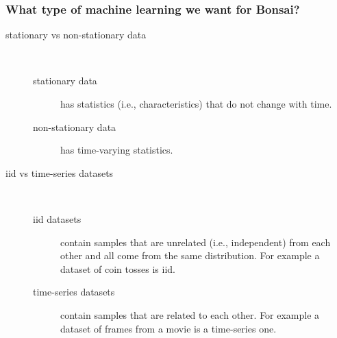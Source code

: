 \begin{frame}
    \frametitle{What type of machine learning we want for Bonsai?}

    \begin{description}

        \item[stationary vs non-stationary data]\mbox{}\\

            \begin{description}

                \item[stationary data] has statistics (i.e., characteristics)
                    that do not change with time.

                \item[non-stationary data] has time-varying statistics.

            \end{description}

        \item[iid vs time-series datasets]\mbox{}\\

            \begin{description}

                \item[iid datasets] contain samples that are unrelated (i.e., independent) from each other and all come from the same distribution. For example a dataset of coin tosses is iid.

                \item[time-series datasets] contain samples that are related to each other. For example a dataset of frames from a movie is a time-series one.

            \end{description}

    \end{description}

\end{frame}

